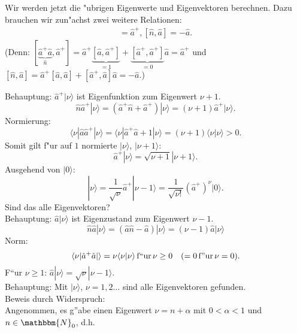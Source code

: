 Wir werden jetzt die "ubrigen Eigenwerte und Eigenvektoren berechnen. Dazu brauchen wir zun"achst zwei weitere
Relationen:
\begin{align}
	[\hat n, \hat a^+] = \hat a^+,
	[\hat n, \hat a]=-\hat a.
\end{align}
(Denn: $[\underbrace{\hat a^+\hat a}_{\hat n}, \hat a^+] = \hat a^+ \underbrace{[\hat a, \hat a^+]}_{=1} + 
\underbrace{[\hat a^+,\hat a^+]}_{=0} \hat a = \hat a^+$ und 
$[\hat n, \hat a] = \hat a^+ [\hat a, \hat a] + [\hat a^+, \hat a]\hat a=-\hat a$.)

Behauptung: $\hat a^+ |\nu \rangle$ ist Eigenfunktion zum Eigenwert $\nu+1$.
\begin{equation}
	\hat n \hat a^+ |\nu\rangle = (\hat a^+ \hat n + \hat a^+) |\nu\rangle = (\nu+1)\hat a^+ |\nu\rangle.
\end{equation}
Normierung: 
\begin{equation}
	\langle \nu| \hat a \hat a^+|\nu\rangle = \langle \nu|\hat a^+ \hat a + 1|\nu \rangle=
	(\nu+1) \langle \nu|\nu \rangle >0.
\end{equation}
Somit gilt f"ur auf $1$ normierte $|\nu\rangle$, $|\nu+1\rangle$: 
\begin{equation}
	\hat a^+ |\nu\rangle = \sqrt{\nu+1} |\nu+1\rangle.
\end{equation}
Ausgehend von $|0 \rangle$:
\begin{equation}
	 |\nu \rangle = \frac{1}{\sqrt{\nu}}\hat a^+|\nu-1\rangle = \frac{1}{\sqrt{\nu!}}(\hat a^+)^\nu|0\rangle.
\end{equation}
Sind das alle Eigenvektoren?\\
Behauptung: $\hat a |\nu\rangle$ ist Eigenzustand zum Eigenwert $\nu-1$.
\begin{equation}
	 \hat n \hat a |\nu \rangle = (\hat a \hat n -\hat a)|\nu \rangle = (\nu-1)\hat a |\nu\rangle 
\end{equation}
Norm:	 
\begin{equation}
	 \langle \nu|\hat a^+ \hat a| \rangle = \nu \langle \nu |\nu \rangle \, \textnormal{f``ur} 
	 \, \nu\geq 0 \quad (=0 \, \textnormal{f''ur} \, \nu=0).
\end{equation}
F``ur $\nu \geq 1$: $\hat a |\nu \rangle = \sqrt{\nu}|\nu-1\rangle$.\\
Behauptung: Mit $|\nu \rangle$, $\nu=1,2\dots$ sind alle Eigenvektoren gefunden.\\
Beweis durch Widerspruch:\\
Angenommen, es g''abe einen Eigenwert $\nu=n+\alpha$ mit $0<\alpha<1$ und $n \in \mathbbm{N}_0$, d.h.
